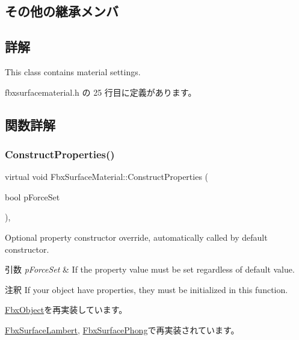 \subsection*{その他の継承メンバ}


\subsection{詳解}
This class contains material settings. 

 fbxsurfacematerial.\+h の 25 行目に定義があります。



\subsection{関数詳解}
\mbox{\label{class_fbx_surface_material_aafc5d21293bea6b63a6ea96fa9fe0bb2}} 
\subsubsection{\texorpdfstring{Construct\+Properties()}{ConstructProperties()}}
{\footnotesize\ttfamily virtual void Fbx\+Surface\+Material\+::\+Construct\+Properties (\begin{DoxyParamCaption}\item[{bool}]{p\+Force\+Set }\end{DoxyParamCaption})\hspace{0.3cm}{\ttfamily [protected]}, {\ttfamily [virtual]}}

Optional property constructor override, automatically called by default constructor. 
\begin{DoxyParams}{引数}
{\em p\+Force\+Set} & If the property value must be set regardless of default value. \\
\hline
\end{DoxyParams}
\begin{DoxyRemark}{注釈}
If your object have properties, they must be initialized in this function. 
\end{DoxyRemark}


\hyperlink{class_fbx_object_ad44f814323dc1b5e78bff1bfc608b4bb}{Fbx\+Object}を再実装しています。



\hyperlink{class_fbx_surface_lambert_a6693e1c08050978c78eece2aa48688e9}{Fbx\+Surface\+Lambert}, \hyperlink{class_fbx_surface_phong_aa4262a042d35769e8ff745d408315bf9}{Fbx\+Surface\+Phong}で再実装されています。

